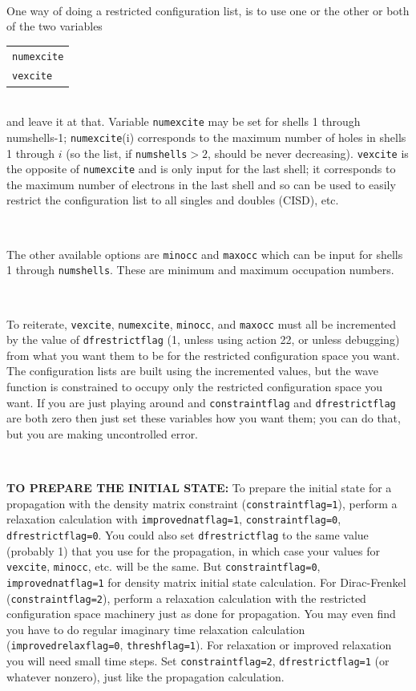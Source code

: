 \documentclass[10pt,leqno, oneside]{book}
\begin{document}
 \
 
One way of doing a restricted configuration list, is to use one or the other or both of the two variables
\begin{tabular}{l}
\qquad \verb#numexcite# \\
\qquad \verb#vexcite#  \\
\end{tabular} \\
and leave it at that. 
Variable \verb#numexcite# may be set for shells 1 through numshells-1; \verb#numexcite#(i) corresponds to the maximum number of holes in shells 
1 through $i$ (so the list, if \verb#numshells#$>2$, should be never decreasing).  
\verb#vexcite# is the opposite of \verb#numexcite# and is only input for the last shell; it
corresponds to the maximum number of electrons in the last shell and so can be used 
to easily restrict the configuration list to all singles and doubles (CISD), etc.  

\

The other available options are \verb#minocc# and \verb#maxocc# which can be input for shells 1 through \verb#numshells#.
These are minimum and maximum occupation numbers.

\

To reiterate, \verb#vexcite#, \verb#numexcite#, \verb#minocc#, and \verb#maxocc# must all be incremented by the value of \verb#dfrestrictflag#
(1, unless using action 22, or unless debugging) from what you want them to be for the restricted configuration space you want. The configuration
lists are built using the incremented values, but the wave function is constrained to occupy only the restricted configuration space you want.
 If you are just
playing around and \verb#constraintflag# and \verb#dfrestrictflag# are both zero then just set these variables how you want them; you can do that,
but you are making uncontrolled error.

\

\textbf{TO PREPARE THE INITIAL STATE:}  To prepare the initial state for a propagation with the
density matrix constraint (\verb#constraintflag=1#), 
perform a relaxation calculation with \verb#improvednatflag=1#, \verb#constraintflag=0#, \verb#dfrestrictflag=0#.
You could also set \verb#dfrestrictflag# to the same value (probably 1) that you use for the propagation, in which case
your values for \verb#vexcite#, \verb#minocc#, etc. will be the same.  But \verb#constraintflag=0#, \verb#improvednatflag=1#
 for density matrix
initial state calculation.
  For Dirac-Frenkel (\verb#constraintflag=2#),
perform a relaxation calculation with the restricted configuration space machinery just as done for propagation.  You may even 
find you have to do regular imaginary time relaxation calculation (\verb#improvedrelaxflag=0#, \verb#threshflag=1#).  For relaxation
or improved relaxation you will need small time steps.  Set \verb#constraintflag=2#, \verb#dfrestrictflag=1# (or whatever nonzero),
just like the propagation calculation.
\end{document}

